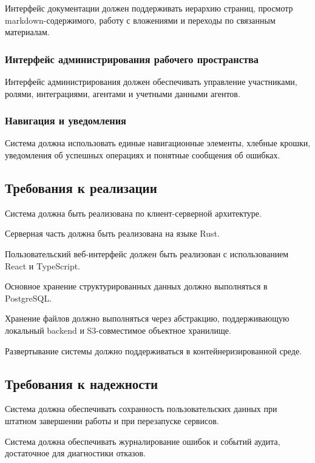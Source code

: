 Интерфейс документации должен поддерживать иерархию страниц, просмотр markdown-содержимого, работу с вложениями и переходы по связанным материалам.

\subsubsection{Интерфейс администрирования рабочего пространства}

Интерфейс администрирования должен обеспечивать управление участниками, ролями, интеграциями, агентами и учетными данными агентов.

\subsubsection{Навигация и уведомления}

Система должна использовать единые навигационные элементы, хлебные крошки, уведомления об успешных операциях и понятные сообщения об ошибках.

\textheadingsep
\subsection{Требования к реализации}

\headingtextsep

Система должна быть реализована по клиент-серверной архитектуре.

Серверная часть должна быть реализована на языке Rust.

Пользовательский веб-интерфейс должен быть реализован с использованием React и TypeScript.

Основное хранение структурированных данных должно выполняться в PostgreSQL.

Хранение файлов должно выполняться через абстракцию, поддерживающую локальный backend и S3-совместимое объектное хранилище.

Развертывание системы должно поддерживаться в контейнеризированной среде.

\textheadingsep
\subsection{Требования к надежности}

\headingtextsep

Система должна обеспечивать сохранность пользовательских данных при штатном завершении работы и при перезапуске сервисов.

Система должна обеспечивать журналирование ошибок и событий аудита, достаточное для диагностики отказов.

